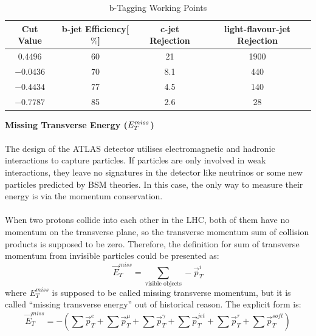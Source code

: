 \begin{table}[h]
	\caption{b-Tagging Working Points}
	\renewcommand{\arraystretch}{1.5}
	\centering
	\begin{adjustbox}{center}
		\begin{tabular}{|c | c | c | c |}
			\hline
			\hline
			{\bf Cut Value}    & {\bf b-jet Efficiency[$\%$]}  & {\bf c-jet Rejection} & {\bf light-flavour-jet Rejection}\\
			\hline
			0.4496 & 60 & 21 & 1900 \\
			\hline
			$-$0.0436& 70 & 8.1& 440 \\
			\hline
			$-0.4434$& 77 & 4.5& 140 \\
			\hline
			$-0.7787$& 85 & 2.6&  28 \\
			\hline
		\end{tabular}
	\end{adjustbox}
	\label{Tab:b-tag}
\end{table}		
\noindent
{\bf Missing Transverse Energy ($E_{T}^{miss}$)}
\\
\\The design of the ATLAS detector utilises electromagnetic and hadronic interactions to capture particles. If particles are only involved in weak interactions, they leave no signatures in the detector like neutrinos or some new particles predicted by BSM theories. In this case, the only way to measure their energy is via the momentum conservation. 
\\
\\When two protons collide into each other in the LHC, both of them have no momentum on the transverse plane, so the transverse momentum sum of collision products is supposed to be zero. Therefore, the definition for sum of transverse momentum from invisible particles could be presented as:
\begin{equation}
\vec{E}_{T}^{miss} = \sum_{\text{visible objects}} -\vec{p}_{T}^{i}
\end{equation}
where $E_{T}^{miss}$ is supposed to be called missing transverse momentum, but it is called ``missing transverse energy'' out of historical reason. The explicit form is:
\begin{equation}
\vec{E}_{T}^{miss} = -(\sum \vec{p}_{T}^{e} +\sum \vec{p}_{T}^{\mu} +\sum \vec{p}_{T}^{\gamma} +\sum \vec{p}_{T}^{jet} +\sum \vec{p}_{T}^{\tau}+\sum \vec{p}_{T}^{soft})
\end{equation}
